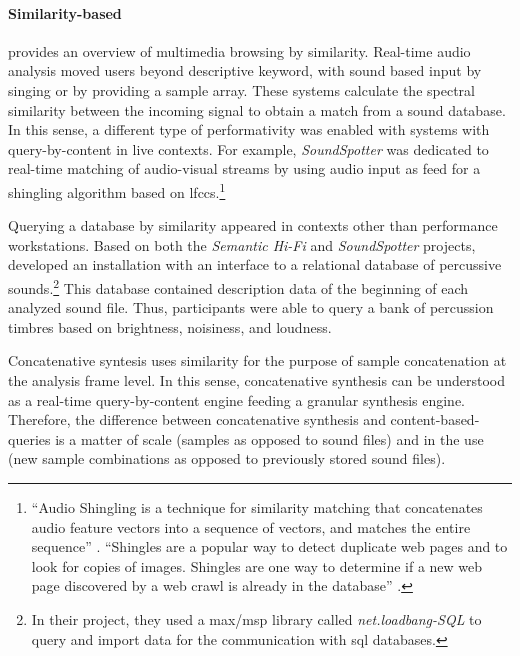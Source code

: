 	\paragraph{Similarity-based}
	\textcite{Frisson2015} provides an overview of multimedia browsing by similarity. Real-time audio analysis moved users beyond descriptive keyword, with sound based input by singing or by providing a sample array. These systems calculate the spectral similarity between the incoming signal to obtain a match from a sound database. In this sense, a different type of performativity was enabled with systems with query-by-content in live contexts. For example, \textit{SoundSpotter} \parencite{DBLP:conf/icmc/CaseyG07} was dedicated to real-time matching of audio-visual streams by using audio input as feed for a shingling algorithm based on \glspl{lfcc}.\footnote{``Audio Shingling is a technique for similarity matching that concatenates audio feature vectors into a sequence of vectors, and matches the entire sequence'' \parencite{DBLP:conf/icmc/CaseyG07}. ``Shingles are a popular way to detect duplicate web pages and to look for copies of images. Shingles are one way to determine if a new web page discovered by a web crawl is already in the database'' \parencite{DBLP:conf/ismir/CaseyS06}.}

	Querying a database by similarity appeared in contexts other than performance workstations. Based on both the \textit{Semantic Hi-Fi} and \textit{SoundSpotter} projects, \textcite{Price2008} developed an installation with an interface to a relational database of percussive sounds.\footnote{In their project, they used a \gls{max/msp} library called \textit{net.loadbang-SQL} to query and import data for the communication with \gls{sql} databases.} This database contained description data of the beginning of each analyzed sound file. Thus, participants were able to query a bank of percussion timbres based on brightness, noisiness, and loudness. 

	Concatenative syntesis uses similarity for the purpose of sample concatenation at the analysis frame level. In this sense, concatenative synthesis can be understood as a real-time query-by-content engine feeding a granular synthesis engine. Therefore, the difference between concatenative synthesis and content-based-queries is a matter of scale (samples as opposed to sound files) and in the use (new sample combinations as opposed to previously stored sound files). 


